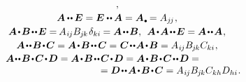 \begin{equation}
\begin{array}{c}
\hspace{.12ex} ,
\\[.2em]
%
\bm{A} \hspace{-0.1ex} \dotdotp \hspace{-0.1ex} \bm{E} = \bm{E} \dotdotp \hspace{-0.1ex} \bm{A} = \bm{A}\hspace{.15ex}\tracedot = A_{j\hspace{-0.15ex}j} \hspace{.12ex} ,
\\[.2em]
%
\bm{A} \narrowdotp \bm{B} \narrowdotdotp \bm{E} = \hspace{-0.16ex} A_{\hspace{.1ex}i\hspace{-0.1ex}j} B_{\hspace{-0.1ex}j\hspace{-0.1ex}k} \hspace{.2ex} \delta_{ki} \hspace{-0.1ex} = \bm{A} \narrowdotdotp \bm{B} ,
\:\:
\bm{A} \narrowdotp \bm{A} \narrowdotdotp \bm{E} = \bm{A} \narrowdotdotp \bm{A}
\hspace{.12ex} ,
\\[.2em]
%
\bm{A} \narrowdotdotp \bm{B} \narrowdotp \bm{C} = \bm{A} \narrowdotp \bm{B} \narrowdotdotp \hspace{.1ex} \bm{C} = \hspace{.1ex} \bm{C} \narrowdotdotp \hspace{-0.1ex} \bm{A} \narrowdotp \bm{B} = A_{\hspace{.1ex}i\hspace{-0.1ex}j} B_{\hspace{-0.1ex}j\hspace{-0.1ex}k} C_{ki} \hspace{.1ex} ,
\\[.15em]
%
\bm{A} \hspace{-0.1ex}\narrowdotdotp \bm{B} \narrowdotp \bm{C} \narrowdotp \bm{D} = \bm{A} \narrowdotp \bm{B} \narrowdotdotp \bm{C} \narrowdotp \bm{D} = \bm{A} \narrowdotp \bm{B} \narrowdotp \bm{C} \narrowdotdotp \bm{D} = \hspace*{3em} \\
\hspace{11em} = \bm{D} \narrowdotdotp \bm{A} \narrowdotp \bm{B} \narrowdotp \bm{C} = A_{\hspace{.1ex}i\hspace{-0.1ex}j} B_{\hspace{-0.1ex}j\hspace{-0.1ex}k} C_{kh} D_{hi} \hspace{.1ex}.
\end{array}
\end{equation}

